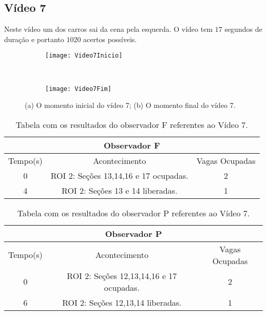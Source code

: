 \subsection{Vídeo 7}

Neste vídeo um dos carros sai da cena pela esquerda. O vídeo tem $17$ segundos de duração e portanto $1020$ acertos possíveis.

\begin{figure}[H]
\centering
\begin{subfigure}{.5\textwidth}
\centering
\texttt{[image: Video7Inicio]}
\caption{}
\end{subfigure}\
\begin{subfigure}{.5\textwidth}
\centering
\texttt{[image: Video7Fim]}
\caption{}
\end{subfigure}
\centering
\caption{(a) O momento inicial do vídeo 7; (b) O momento final do vídeo 7.}%
\label{}%
\end{figure}

\begin{table}[H]
\begin{center}
\begin{tabular}{|c||c||c|}
\hline
\multicolumn{3}{|c|}{Observador F}  \\ \hline \hline
Tempo(s) & Acontecimento & Vagas Ocupadas \\ \hline
0 & ROI 2: Seções 13,14,16 e 17 ocupadas. & 2 \\ \hline
4 & ROI 2: Seções 13 e 14 liberadas. & 1 \\
\hline
\end{tabular}
\end{center}
\caption{Tabela com os resultados do observador F referentes ao Vídeo 7.}
\label{tab:video7F}
\end{table}

\begin{table}[H]
\begin{center}
\begin{tabular}{|c||c||c|}
\hline
\multicolumn{3}{|c|}{Observador P}  \\ \hline \hline
Tempo(s) & Acontecimento & Vagas Ocupadas \\ \hline
0 & ROI 2: Seções 12,13,14,16 e 17 ocupadas. & 2 \\ \hline
6 & ROI 2: Seções 12,13,14 liberadas. & 1 \\ 
\hline
\end{tabular}
\end{center}
\caption{Tabela com os resultados do observador P referentes ao Vídeo 7.}
\label{tab:video7P}
\end{table}

